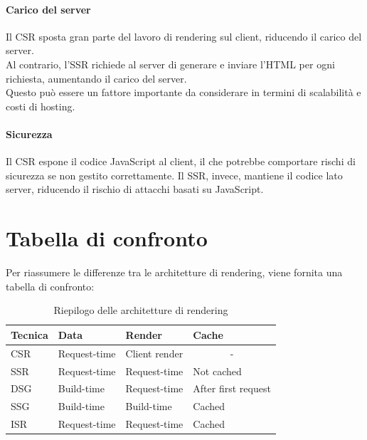 \paragraph{Carico del server}
Il CSR sposta gran parte del lavoro di rendering sul client, riducendo il carico del server.\\
Al contrario, l'SSR richiede al server di generare e inviare l'HTML per ogni richiesta, aumentando il carico del server.\\
Questo può essere un fattore importante da considerare in termini di scalabilità e costi di hosting.

\paragraph{Sicurezza}
Il CSR espone il codice JavaScript al client, il che potrebbe comportare rischi di sicurezza se non gestito
correttamente.
Il SSR, invece, mantiene il codice lato server, riducendo il rischio di attacchi basati su JavaScript.

\section{Tabella di confronto}
Per riassumere le differenze tra le architetture di rendering, viene fornita una tabella di confronto:
\\
\begin{table}[h]
    \centering
    \begin{tabular}{|l|l|l|l|}
    \hline
    \textbf{Tecnica} & \textbf{Data}        & \textbf{Render}       & \textbf{Cache}            \\ \hline
    CSR              & Request-time         & Client render         & \multicolumn{1}{c|}{-}    \\ \hline
    SSR              & Request-time         & Request-time          & Not cached                \\ \hline
    DSG              & Build-time           & Request-time          & After first request       \\ \hline
    SSG              & Build-time           & Build-time            & Cached                    \\ \hline
    ISR              & Request-time         & Request-time          & Cached                    \\ \hline
    \end{tabular}
    \caption{Riepilogo delle architetture di rendering}
\end{table}
